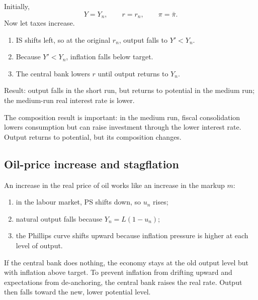 \documentclass[12pt]{article}
\begin{document}
\begin{examplebox}[title={Worked Example: Short-run versus medium-run effect of higher taxes}]
Initially,
\[
Y=Y_n,\qquad r=r_n,\qquad \pi=\bar{\pi}.
\]
Now let taxes increase.
\begin{enumerate}[leftmargin=1.5em]
\item IS shifts left, so at the original \(r_n\), output falls to \(Y'<Y_n\).
\item Because \(Y'<Y_n\), inflation falls below target.
\item The central bank lowers \(r\) until output returns to \(Y_n\).
\end{enumerate}
Result: output falls in the short run, but returns to potential in the medium run; the medium-run real interest rate is lower.
\end{examplebox}

\begin{policynote}
The composition result is important: in the medium run, fiscal consolidation lowers consumption but can raise investment through the lower interest rate. Output returns to potential, but its composition changes.
\end{policynote}

\newpage
\subsection{Oil-price increase and stagflation}

An increase in the real price of oil works like an increase in the markup \(m\):
\begin{enumerate}[leftmargin=1.5em]
\item in the labour market, PS shifts down, so \(u_n\) rises;
\item natural output falls because \(Y_n=L(1-u_n)\);
\item the Phillips curve shifts upward because inflation pressure is higher at each level of output.
\end{enumerate}

If the central bank does nothing, the economy stays at the old output level but with inflation above target. To prevent inflation from drifting upward and expectations from de-anchoring, the central bank raises the real rate. Output then falls toward the new, lower potential level.
\end{document}
